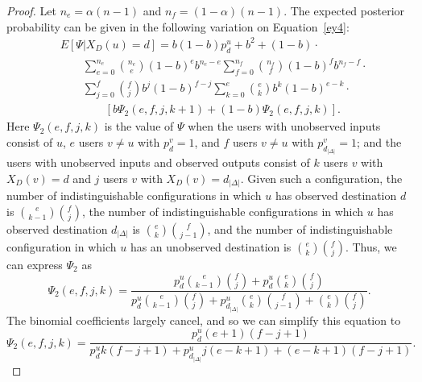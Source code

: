 \documentclass[prodmode,acmtissec]{acmsmall}
\begin{document}
\begin{proof}
Let $n_e = \alpha(n-1)$ and $n_f = (1-\alpha)(n-1)$.  The expected posterior probability can be given in the following variation on Equation~\ref{ey4}:
\begin{equation} \label{eq:yasymp}
\begin{split}
  &E[\Psi | X_D(u)=d] = b(1-b)p^u_d + b^2 + (1-b) \cdot\\
  &\qquad \sum_{e=0}^{n_e} \binom{n_e}{e} (1-b)^e b^{n_e-e} \sum_{f=0}^{n_f} \binom{n_f}{f} (1-b)^f b^{n_f-f} \cdot\\
  &\qquad \sum_{j=0}^f \binom{f}{j} b^j (1-b)^{f-j} \sum_{k=0}^{e} \binom{e}{k} b^k (1-b)^{e-k}\cdot \\
  &\qquad \qquad \left[ b \Psi_2(e,f,j,k+1) + (1-b)\Psi_2(e,f,j,k)  \right].
\end{split}
\end{equation}
Here $\Psi_2(e,f,j,k)$ is the value of $\Psi$ when the users with unobserved inputs consist of $u$, $e$ users $v\neq u$ with $p^v_d = 1$, and $f$ users $v\neq u$ with $p^v_{d_{|\Delta|}}=1$; and the users with unobserved inputs and observed outputs consist of $k$ users $v$ with $X_D(v)=d$ and $j$ users $v$ with $X_D(v)=d_{|\Delta|}$.  Given such a configuration, the number of indistinguishable configurations in which $u$ has observed destination $d$ is $\binom{e}{k-1} \binom{f}{j}$, the number of indistinguishable configurations in which $u$ has observed destination $d_{|\Delta|}$ is $\binom{e}{k} \binom{f}{j-1}$, and the number of indistinguishable configuration in which $u$ has an unobserved destination is $\binom{e}{k} \binom{f}{j}$.  Thus, we can express $\Psi_2$ as
\begin{equation*}
\Psi_2(e,f,j,k) =  \frac{p^u_d \binom{e}{k-1}\binom{f}{j} + p^u_d \binom{e}{k}\binom{f}{j}}{p^u_d \binom{e}{k-1}\binom{f}{j} + p^u_{d_{|\Delta|}} \binom{e}{k}\binom{f}{j-1} + \binom{e}{k}\binom{f}{j}}.
\end{equation*}
The binomial coefficients largely cancel, and so we can simplify this equation to
\begin{equation*}
\Psi_2(e,f,j,k) = \frac{p^u_d (e+1)(f-j+1)}{p^u_d k (f-j+1) + p^u_{d_{|\Delta|}} j(e-k+1) + (e-k+1)(f-j+1) } \label{eq:y}.
\end{equation*}


\end{proof}
\end{document}
